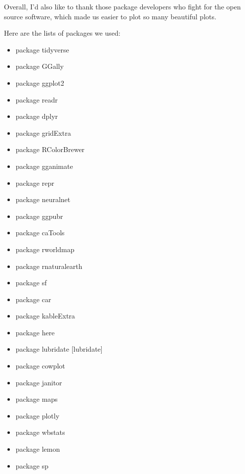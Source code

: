 \documentclass[11pt,a4paper,]{article}
\providecommand{\tightlist}{%
  \setlength{\itemsep}{0pt}\setlength{\parskip}{0pt}}
\begin{document}
Overall, I'd also like to thank those package developers who fight for the open source software, which made us easier to plot so many beautiful plots.

Here are the lists of packages we used:

\begin{itemize}
\tightlist
\item
  package tidyverse \autocite{tidyverse}
\item
  package GGally \autocite{GGally}
\item
  package ggplot2 \autocite{ggplot2}
\item
  package readr \autocite{readr}
\item
  package dplyr \autocite{dplyr}
\item
  package gridExtra \autocite{gridExtra}
\item
  package RColorBrewer \autocite{RColorBrewer}
\item
  package gganimate \autocite{gganimate}
\item
  package repr \autocite{repr}
\item
  package neuralnet \autocite{neuralnet}
\item
  package ggpubr \autocite{ggpubr}
\item
  package caTools \autocite{caTools}
\item
  package rworldmap \autocite{rworldmap}
\item
  package rnaturalearth \autocite{rnaturalearth}
\item
  package sf \autocite{sf}
\item
  package car \autocite{car}
\item
  package kableExtra \autocite{kableExtra}
\item
  package here \autocite{here}
\item
  package lubridate {[}lubridate{]}
\item
  package cowplot \autocite{cowplot}
\item
  package janitor \autocite{janitor}
\item
  package maps \autocite{maps}
\item
  package plotly \autocite{plotly}
\item
  package wbstats \autocite{wbstats}
\item
  package lemon \autocite{lemon}
\item
  package sp \autocite{sp}
\end{itemize}

\clearpage
\end{document}
